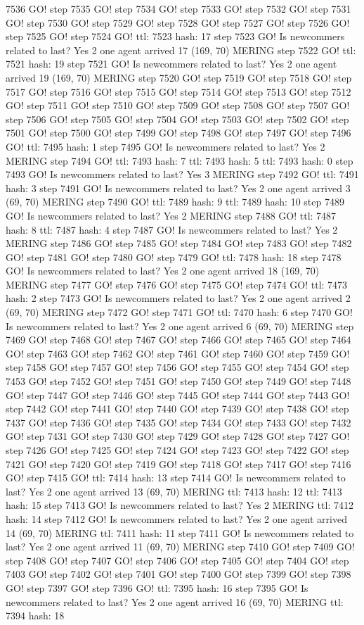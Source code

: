7536 GO! step 7535 GO! step 7534 GO! step 7533 GO! step 7532 GO! step 7531 GO! step 7530 GO! step 7529 GO! step 7528 GO! step 7527 GO! step 7526 GO! step 7525 GO! step 7524 GO! ttl: 7523 hash: 17 step 7523 GO! Is newcommers related to last? Yes 2 one agent arrived 17 (169, 70) MERING step 7522 GO! ttl: 7521 hash: 19 step 7521 GO! Is newcommers related to last? Yes 2 one agent arrived 19 (169, 70) MERING step 7520 GO! step 7519 GO! step 7518 GO! step 7517 GO! step 7516 GO! step 7515 GO! step 7514 GO! step 7513 GO! step 7512 GO! step 7511 GO! step 7510 GO! step 7509 GO! step 7508 GO! step 7507 GO! step 7506 GO! step 7505 GO! step 7504 GO! step 7503 GO! step 7502 GO! step 7501 GO! step 7500 GO! step 7499 GO! step 7498 GO! step 7497 GO! step 7496 GO! ttl: 7495 hash: 1 step 7495 GO! Is newcommers related to last? Yes 2 MERING step 7494 GO! ttl: 7493 hash: 7 ttl: 7493 hash: 5 ttl: 7493 hash: 0 step 7493 GO! Is newcommers related to last? Yes 3 MERING step 7492 GO! ttl: 7491 hash: 3 step 7491 GO! Is newcommers related to last? Yes 2 one agent arrived 3 (69, 70) MERING step 7490 GO! ttl: 7489 hash: 9 ttl: 7489 hash: 10 step 7489 GO! Is newcommers related to last? Yes 2 MERING step 7488 GO! ttl: 7487 hash: 8 ttl: 7487 hash: 4 step 7487 GO! Is newcommers related to last? Yes 2 MERING step 7486 GO! step 7485 GO! step 7484 GO! step 7483 GO! step 7482 GO! step 7481 GO! step 7480 GO! step 7479 GO! ttl: 7478 hash: 18 step 7478 GO! Is newcommers related to last? Yes 2 one agent arrived 18 (169, 70) MERING step 7477 GO! step 7476 GO! step 7475 GO! step 7474 GO! ttl: 7473 hash: 2 step 7473 GO! Is newcommers related to last? Yes 2 one agent arrived 2 (69, 70) MERING step 7472 GO! step 7471 GO! ttl: 7470 hash: 6 step 7470 GO! Is newcommers related to last? Yes 2 one agent arrived 6 (69, 70) MERING step 7469 GO! step 7468 GO! step 7467 GO! step 7466 GO! step 7465 GO! step 7464 GO! step 7463 GO! step 7462 GO! step 7461 GO! step 7460 GO! step 7459 GO! step 7458 GO! step 7457 GO! step 7456 GO! step 7455 GO! step 7454 GO! step 7453 GO! step 7452 GO! step 7451 GO! step 7450 GO! step 7449 GO! step 7448 GO! step 7447 GO! step 7446 GO! step 7445 GO! step 7444 GO! step 7443 GO! step 7442 GO! step 7441 GO! step 7440 GO! step 7439 GO! step 7438 GO! step 7437 GO! step 7436 GO! step 7435 GO! step 7434 GO! step 7433 GO! step 7432 GO! step 7431 GO! step 7430 GO! step 7429 GO! step 7428 GO! step 7427 GO! step 7426 GO! step 7425 GO! step 7424 GO! step 7423 GO! step 7422 GO! step 7421 GO! step 7420 GO! step 7419 GO! step 7418 GO! step 7417 GO! step 7416 GO! step 7415 GO! ttl: 7414 hash: 13 step 7414 GO! Is newcommers related to last? Yes 2 one agent arrived 13 (69, 70) MERING ttl: 7413 hash: 12 ttl: 7413 hash: 15 step 7413 GO! Is newcommers related to last? Yes 2 MERING ttl: 7412 hash: 14 step 7412 GO! Is newcommers related to last? Yes 2 one agent arrived 14 (69, 70) MERING ttl: 7411 hash: 11 step 7411 GO! Is newcommers related to last? Yes 2 one agent arrived 11 (69, 70) MERING step 7410 GO! step 7409 GO! step 7408 GO! step 7407 GO! step 7406 GO! step 7405 GO! step 7404 GO! step 7403 GO! step 7402 GO! step 7401 GO! step 7400 GO! step 7399 GO! step 7398 GO! step 7397 GO! step 7396 GO! ttl: 7395 hash: 16 step 7395 GO! Is newcommers related to last? Yes 2 one agent arrived 16 (69, 70) MERING ttl: 7394 hash: 18 